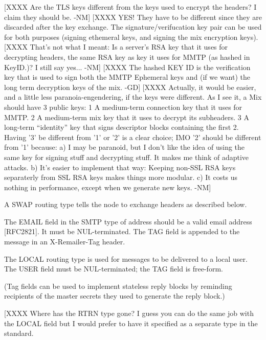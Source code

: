[XXXX Are the TLS keys different from the keys used to encrypt the
      headers?  I claim they should be. -NM]
[XXXX YES! They have to be different since they are discarded after
      the key exchange. The signature/verifucation key pair can be
      used for both purposes (signing ethemeral keys, and signing the
      mix encryption keys).
[XXXX That's not what I meant:  Is a server's RSA key that it uses 
      for decrypting headers, the same RSA key as key it uses for
      MMTP (as hashed in KeyID.)?  I still say yes... -NM]
[XXXX The hashed KEY ID is the verification key that is used to sign
      both the MMTP Ephemeral keys and (if we want) the long term
      decryption keys of the mix. -GD]
[XXXX Actually, it would be easier, and a little less paranoia-engendering,
      if the keys were different.  As I see it, a Mix should have 3
      public keys:
              1  A medium-term connection key that it uses for MMTP.
              2  A medium-term mix key that it uses to decrypt 
                 its subheaders.
              3  A long-term ``identity'' key that signs descriptor
                 blocks containing the first 2.
         Having '3' be different from '1' or '2' is a clear choice; 
         IMO '2' should be different from '1' because:
                a) I may be paranoid, but I don't like the idea of 
                   using the same key for signing stuff and decrypting
                   stuff.  It makes me think of adaptive attacks.
                b) It's easier to implement that way: Keeping non-SSL 
                   RSA keys separaterly from SSL RSA keys makes things
                   more modular.
                c) It costs us nothing in performance, except when
                   we generate new keys.
             -NM]

A SWAP routing type tells the node to exchange headers as described below.

The EMAIL field in the SMTP type of address should be a valid email
address [RFC2821].  It must be NUL-terminated.  The TAG field is
appended to the message in an X-Remailer-Tag header.

The LOCAL routing type is used for messages to be delivered to a local
user.  The USER field must be NUL-terminated; the TAG field is
free-form.

(Tag fields can be used to implement stateless reply blocks by
reminding recipients of the master secrets they used to generate the
reply block.)

[XXXX Where has the RTRN type gone? I guess you can do the same job
with the LOCAL field but I would prefer to have it specified as a
separate type in the standard. 

